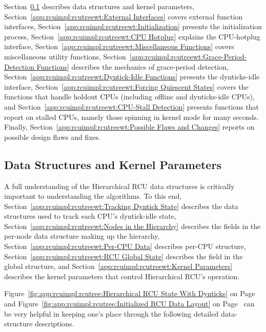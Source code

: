Section~\ref{app:rcuimpl:rcutreewt:Data Structures and Kernel Parameters}
describes data structures and kernel parameters,
Section~\ref{app:rcuimpl:rcutreewt:External Interfaces}
covers external function interfaces,
Section~\ref{app:rcuimpl:rcutreewt:Initialization}
presents the initialization process,
Section~\ref{app:rcuimpl:rcutreewt:CPU Hotplug}
explains the CPU-hotplug interface,
Section~\ref{app:rcuimpl:rcutreewt:Miscellaneous Functions}
covers miscellaneous utility functions,
Section~\ref{app:rcuimpl:rcutreewt:Grace-Period-Detection Functions}
describes the mechanics of grace-period detection,
Section~\ref{app:rcuimpl:rcutreewt:Dyntick-Idle Functions}
presents the dynticks-idle interface,
Section~\ref{app:rcuimpl:rcutreewt:Forcing Quiescent States}
covers the functions that handle holdout CPUs (including offline and
dynticks-idle CPUs), and
Section~\ref{app:rcuimpl:rcutreewt:CPU-Stall Detection}
presents functions that report on stalled CPUs, namely those spinning
in kernel mode for many seconds.
Finally,
Section~\ref{app:rcuimpl:rcutreewt:Possible Flaws and Changes}
reports on possible design flaws and fixes.
\fi

\subsection{Data Structures and Kernel Parameters}
\label{app:rcuimpl:rcutreewt:Data Structures and Kernel Parameters}

A full understanding of the Hierarchical RCU data structures is
critically important to understanding the algorithms.
To this end,
Section~\ref{app:rcuimpl:rcutreewt:Tracking Dyntick State}
describes the data structures used to track each CPU's dyntick-idle state,
Section~\ref{app:rcuimpl:rcutreewt:Nodes in the Hierarchy}
describes the fields in the per-node data structure making up the
 hierarchy,
Section~\ref{app:rcuimpl:rcutreewt:Per-CPU Data}
describes per-CPU  structure,
Section~\ref{app:rcuimpl:rcutreewt:RCU Global State}
describes the field in the global  structure,
and
Section~\ref{app:rcuimpl:rcutreewt:Kernel Parameters}
describes the kernel parameters that control Hierarchical RCU's
operation.

Figure~\ref{fig:app:rcuimpl:rcutree:Hierarchical RCU State With Dynticks}
on
Page~\pageref{fig:app:rcuimpl:rcutree:Hierarchical RCU State With Dynticks}
and
Figure~\ref{fig:app:rcuimpl:rcutree:Initialized RCU Data Layout}
on
Page~\pageref{fig:app:rcuimpl:rcutree:Initialized RCU Data Layout}
can be very helpful in keeping one's place through the following detailed
data-structure descriptions.

